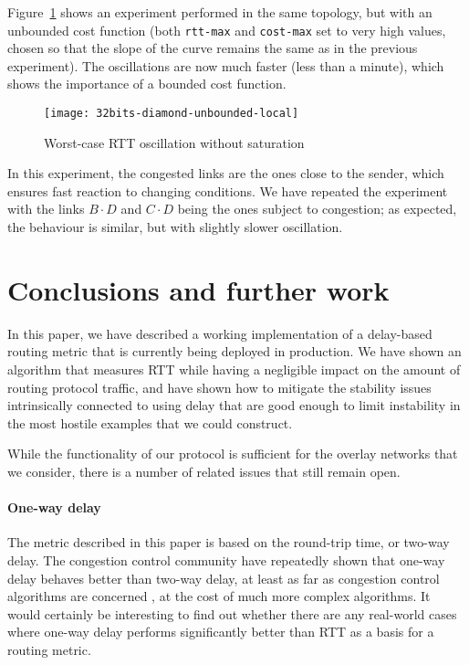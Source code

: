 \documentclass[conference,letterpaper]{IEEEtran}
\begin{document}
Figure~\ref{fig:diamond-stability-rtt-unbounded} shows an experiment
performed in the same topology, but with an unbounded cost function
(both \verb|rtt-max| and \verb|cost-max| set to very high values,
chosen so that the slope of the curve remains the same as in the
previous experiment).  The oscillations are now much faster (less than
a minute), which shows the importance of a bounded cost function.

\begin{figure}[htb]
\centering
\texttt{[image: 32bits-diamond-unbounded-local]}
\caption{Worst-case RTT oscillation without saturation}
\label{fig:diamond-stability-rtt-unbounded}
\end{figure}

In this experiment, the congested links are the ones close to the
sender, which ensures fast reaction to changing conditions.  We have
repeated the experiment with the links $B\cdot D$ and $C\cdot D$ being
the ones subject to congestion; as expected, the behaviour is similar,
but with slightly slower oscillation.

\section{Conclusions and further work}

In this paper, we have described a working implementation of
a delay-based routing metric that is currently being deployed in
production.  We have shown an algorithm that measures RTT while having
a negligible impact on the amount of routing protocol traffic, and
have shown how to mitigate the stability issues intrinsically
connected to using delay that are good enough to limit instability in
the most hostile examples that we could construct.

While the functionality of our protocol is sufficient for the overlay
networks that we consider, there is a number of related issues that
still remain open.

\paragraph{One-way delay}

The metric described in this paper is based on the round-trip time, or
two-way delay.  The congestion control community have repeatedly shown
that one-way delay behaves better than two-way delay, at least as far
as congestion control algorithms are concerned \cite{tcp-lp,ledbat},
at the cost of much more complex algorithms.  It would certainly be
interesting to find out whether there are any real-world cases where
one-way delay performs significantly better than RTT as a basis for
a routing metric.
\end{document}
